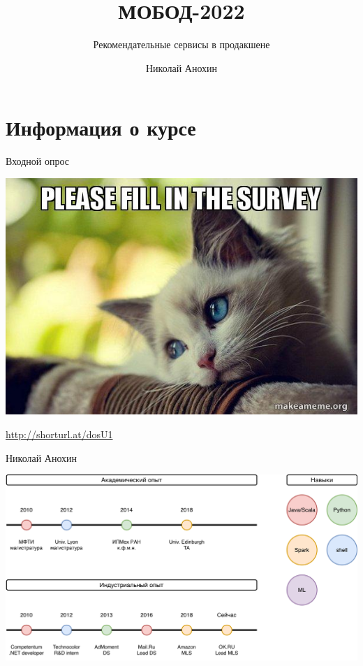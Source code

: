 \documentclass[11pt,aspectratio=169,handout=true]{beamer}
\author{Николай Анохин}
\title{МОБОД-2022}
\subtitle{Рекомендательные сервисы в продакшене}
\begin{document}
{

\begin{frame}
\titlepage
\end{frame}


}

\section{Информация о курсе}

\begin{frame}{Входной опрос}

\begin{center}
\includegraphics[scale=0.5]{images/please.jpeg}

\url{http://shorturl.at/dosU1}
\end{center}

\end{frame}

\begin{frame}{Николай Анохин}

\begin{center}
\includegraphics[scale=0.23]{images/about-me.png}
\end{center}

\end{frame}
\end{document}
